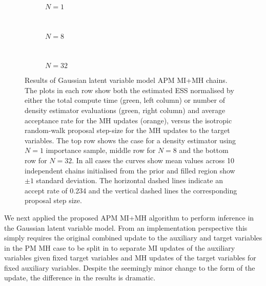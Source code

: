\begin{figure}
\centering
\begin{subfigure}[b]{\linewidth}
\centering
  \caption{$N=1$}
  \label{sfig:apm-mi-mh-1-gaussian-latent}
\end{subfigure}
\\[3mm]
\begin{subfigure}[b]{\linewidth}
\centering
  \caption{$N=8$}
  \label{sfig:apm-mi-mh-8-gaussian-latent}
\end{subfigure}
\\[3mm]
\begin{subfigure}[b]{\linewidth}
\centering
  \caption{$N=32$}
  \label{sfig:apm-mi-mh-32-gaussian-latent}
\end{subfigure}
\caption[\acs{APM} \acs{MI}+\acs{MH} Gaussian model results.]{
Results of Gaussian latent variable model \acs{APM} \acs{MI}+\acs{MH} chains. The plots in each row show both the estimated \ac{ESS} normalised by either the total compute time (green, left column) or number of density estimator evaluations (green, right column) and average acceptance rate for the \ac{MH} updates (orange), versus the isotropic random-walk proposal step-size for the \ac{MH} updates to the target variables. The top row shows the case for a density estimator using $N=1$ importance sample, middle row for $N=8$ and the bottom row for $N=32$. In all cases the curves show mean values across 10 independent chains initialised from the prior and filled region show $\pm 1$ standard deviation. The horizontal dashed lines indicate an accept rate of 0.234 and the vertical dashed lines the corresponding proposal step size.}
\label{fig:apm-mi-mh-gaussian-latent-results}
\end{figure}

We next applied the proposed \ac{APM} \ac{MI}+\ac{MH} algorithm to perform inference in the Gaussian latent variable model. From an implementation perspective this simply requires the original combined update to the auxiliary and target variables in the \ac{PM} \ac{MH} case to be split in to separate \ac{MI} updates of the auxiliary variables given fixed target variables and \ac{MH} updates of the target variables for fixed auxiliary variables. Despite the seemingly minor change to the form of the update, the difference in the results is dramatic.

